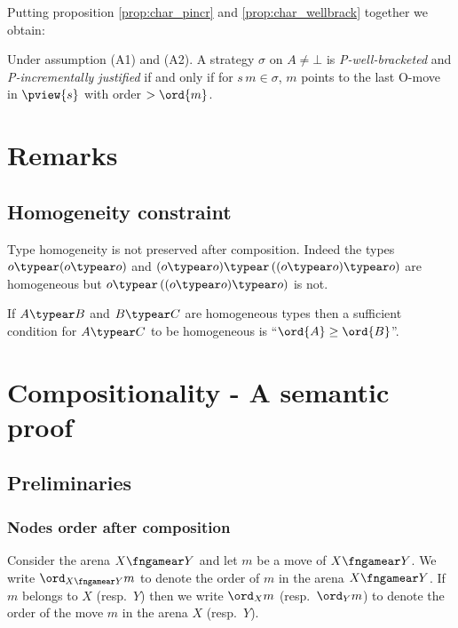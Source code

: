 Putting proposition \ref{prop:char_pincr} and
\ref{prop:char_wellbrack} together we obtain:
\begin{proposition}
Under assumption (A1) and (A2).
A strategy $\sigma$ on $A\neq \bot$
is \emph{P-well-bracketed} and
 \emph{P-incrementally justified} if and only if
for $s \, m \in \sigma$, $m$ points to the last O-move in $\pview{s}$ with order $>\ord{m}$.
\end{proposition}


\section{Remarks}
\subsection{Homogeneity constraint}

Type homogeneity is not preserved after composition. Indeed the types  $o \typear (o \typear o)$ and $(o \typear o) \typear \left((o \typear o) \typear o \right)$ are homogeneous
but $o \typear \left((o \typear o) \typear o\right)$ is not.

If $A\typear B$ and $B \typear C$ are homogeneous types then  a sufficient condition for $A\typear C$ to be homogeneous is  ``$\ord{A} \geq \ord{B}$''.


\section{Compositionality - A semantic proof}

\subsection{Preliminaries}
 
\subsubsection{Nodes order after composition}

Consider the arena $X\fngamear Y$
and let $m$ be a move of $X\fngamear Y$.
We write $\ord_{X\fngamear Y}{m}$
to denote the order of 
$m$ in the arena ${X\fngamear Y}$.
If $m$ belongs to $X$ (resp.~$Y$) then
we write $\ord_X{m}$ 
(resp.~$\ord_Y{m}$) to denote the order of the move $m$ in the arena $X$ (resp.~$Y$).

